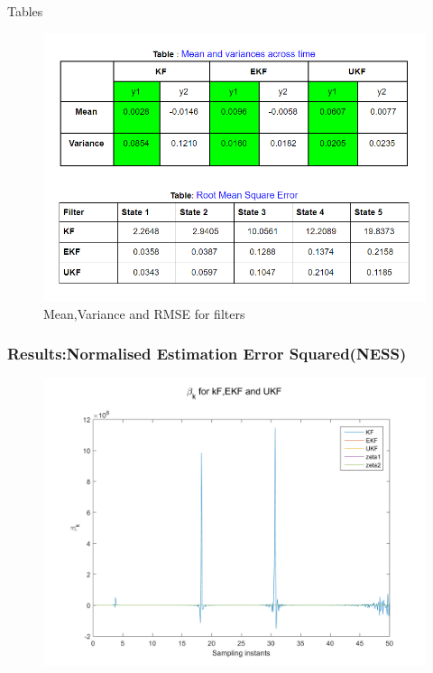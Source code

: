 \documentclass{beamer}
\begin{document}
\begin{frame}{Tables}
    \begin{figure}
        \centering
        \includegraphics[width=0.8\linewidth]{tables.PNG}
        \caption{Mean,Variance and RMSE for filters}
        \label{fig:my_label}
    \end{figure}
\end{frame}
\begin{frame}
\frametitle{Results:Normalised Estimation Error Squared(NESS)}
\begin{figure}
\includegraphics[width=0.8\linewidth]{betak_all.png}
\end{figure}
\end{frame}
\end{document}

